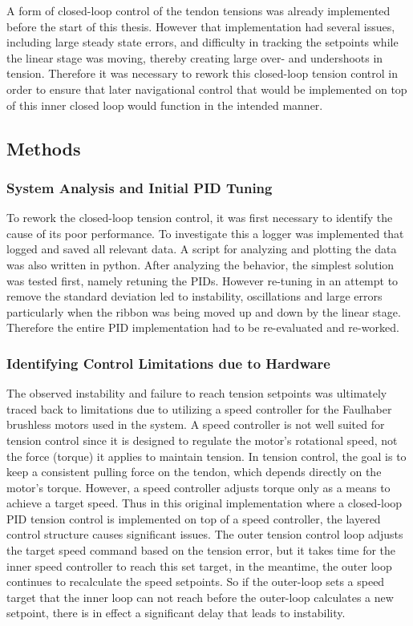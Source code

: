 A form of closed-loop control of the tendon tensions was already implemented before the start of this thesis. However that implementation had several issues, including large steady state errors, and difficulty in tracking the setpoints while the linear stage was moving, thereby creating large over- and undershoots in tension. Therefore it was necessary to rework this closed-loop tension control in order to ensure that later navigational control that would be implemented on top of this inner closed loop would function in the intended manner.

\subsection{Methods}

\subsubsection{System Analysis and Initial PID Tuning}
To rework the closed-loop tension control, it was first necessary to identify the cause of its poor performance. To investigate this a logger was implemented that logged and saved all relevant data. A script for analyzing and plotting the data was also written in python. After analyzing the behavior, the simplest solution was tested first, namely retuning the PIDs. However re-tuning in an attempt to remove the standard deviation led to instability, oscillations and large errors particularly when the ribbon was being moved up and down by the linear stage. Therefore the entire PID implementation had to be re-evaluated and re-worked. 

\subsubsection{Identifying Control Limitations due to Hardware}
The observed instability and failure to reach tension setpoints was ultimately traced back to limitations due to utilizing a speed controller for the Faulhaber brushless motors used in the system. A speed controller is not well suited for tension control since it is designed to regulate the motor's rotational speed, not the force (torque) it applies to maintain tension. In tension control, the goal is to keep a consistent pulling force on the tendon, which depends directly on the motor's torque. However, a speed controller adjusts torque only as a means to achieve a target speed. Thus in this original implementation where a closed-loop PID tension control is implemented on top of a speed controller, the layered control structure causes significant issues. The outer tension control loop adjusts the target speed command based on the tension error, but it takes time for the inner speed controller to reach this set target, in the meantime, the outer loop continues to recalculate the speed setpoints. So if the outer-loop sets a speed target that the inner loop can not reach before the outer-loop calculates a new setpoint, there is in effect a significant delay that leads to instability. 

